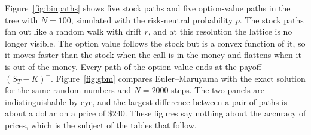 Figure~\ref{fig:binpaths} shows five stock paths and five option-value paths in the tree with $N=100$, simulated with the risk-neutral probability $p$.
The stock paths fan out like a random walk with drift $r$, and at this resolution the lattice is no longer visible.
The option value follows the stock but is a convex function of it, so it moves faster than the stock when the call is in the money and flattens when it is out of the money.
Every path of the option value ends at the payoff $(S_T-K)^+$.
Figure~\ref{fig:gbm} compares Euler--Maruyama with the exact solution for the same random numbers and $N=2000$ steps.
The two panels are indistinguishable by eye, and the largest difference between a pair of paths is about a dollar on a price of $\$240$.
These figures say nothing about the accuracy of prices, which is the subject of the tables that follow.
